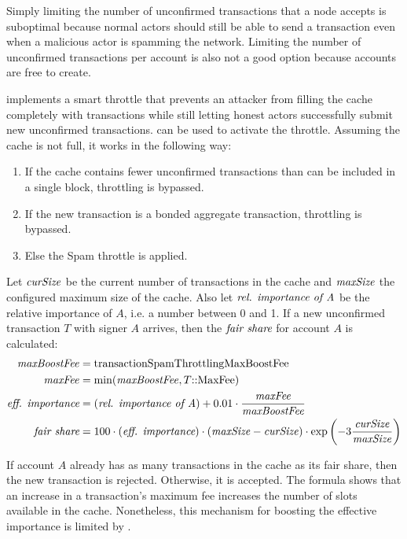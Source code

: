 Simply limiting the number of unconfirmed transactions that a node accepts is suboptimal because normal actors should still be able to send a transaction even when a malicious actor is spamming the network.
Limiting the number of unconfirmed transactions per account is also not a good option because accounts are free to create.

\codenamespace implements a smart throttle that prevents an attacker from filling the cache completely with transactions while still letting honest actors successfully submit new unconfirmed transactions.
 can be used to activate the throttle.
Assuming the cache is not full, it works in the following way:
\begin{enumerate}
	\item{If the cache contains fewer unconfirmed transactions than can be included in a single block, throttling is bypassed.}
	\item{If the new transaction is a bonded aggregate transaction, throttling is bypassed.}
	\item{Else the Spam throttle is applied.}
\end{enumerate}

Let $\mathit{curSize}$ be the current number of transactions in the cache and $\mathit{maxSize}$ the configured maximum size of the cache.
Also let $\textit{rel. importance of A}$ be the relative importance of $A$, i.e. a number between 0 and 1.
If a new unconfirmed transaction $T$ with signer $A$ arrives, then the $\textit{fair share}$ for account $A$ is calculated:
\begin{align*}
	\mathvar{maxBoostFee} &= \nemsetting{node}{transactionSpamThrottlingMaxBoostFee} \\
	\mathvar{maxFee} &= \min(\mathvar{maxBoostFee}, \structField{T}{MaxFee}) \\
	\mathname{eff. importance} &= (\mathname{rel. importance of A}) + 0.01 \cdot \frac{\mathvar{maxFee}}{\mathvar{maxBoostFee}} \\
	\mathname{fair share} &= 100 \cdot (\mathname{eff. importance}) \cdot (\mathvar{maxSize} - \mathvar{curSize}) \cdot \exp\left(-3 \frac{\mathvar{curSize}}{\mathvar{maxSize}}\right)
\end{align*}

If account $A$ already has as many transactions in the cache as its fair share, then the new transaction is rejected.
Otherwise, it is accepted.
The formula shows that an increase in a transaction's maximum fee increases the number of slots available in the cache.
Nonetheless, this mechanism for boosting the effective importance is limited by .

